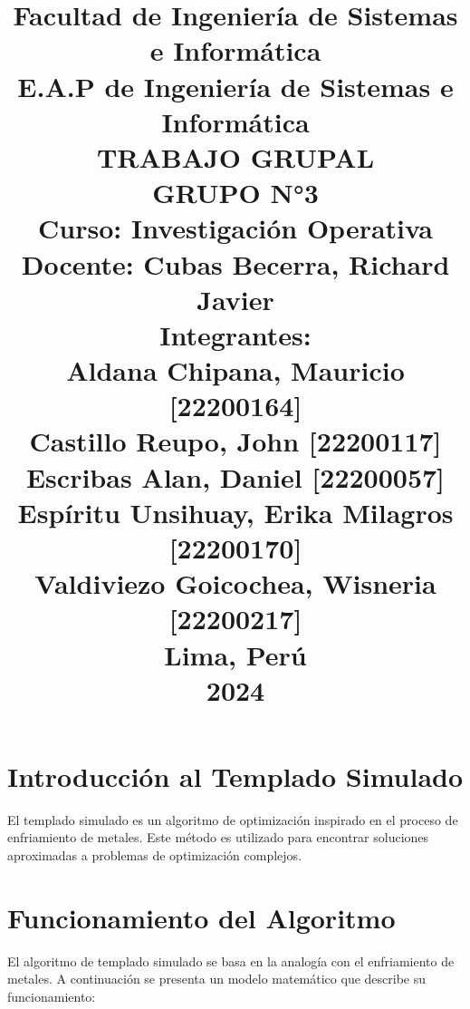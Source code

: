 \documentclass{article}
\begin{document}
\title{
Facultad de Ingeniería de Sistemas e Informática\\
E.A.P de Ingeniería de Sistemas e Informática\\
\vspace{1cm}
TRABAJO GRUPAL\\
\vspace{1cm}
GRUPO N°3\\
\vspace{1cm}
Curso: Investigación Operativa\\
Docente: Cubas Becerra, Richard Javier\\
\vspace{1cm}
Integrantes:\\
Aldana Chipana, Mauricio \hfill [22200164]\\
Castillo Reupo, John \hfill [22200117]\\
Escribas Alan, Daniel \hfill [22200057]\\
Espíritu Unsihuay, Erika Milagros \hfill [22200170]\\
Valdiviezo Goicochea, Wisneria \hfill [22200217]\\
\vspace{1cm}
Lima, Perú\\
2024
}
\date{}

\maketitle
\newpage %

\tableofcontents %
\newpage %

\section{Introducción al Templado Simulado}
El templado simulado es un algoritmo de optimización inspirado en el proceso de enfriamiento de metales. Este método es utilizado para encontrar soluciones aproximadas a problemas de optimización complejos.

\section{Funcionamiento del Algoritmo}
El algoritmo de templado simulado se basa en la analogía con el enfriamiento de metales. A continuación se presenta un modelo matemático que describe su funcionamiento:
\end{document}
